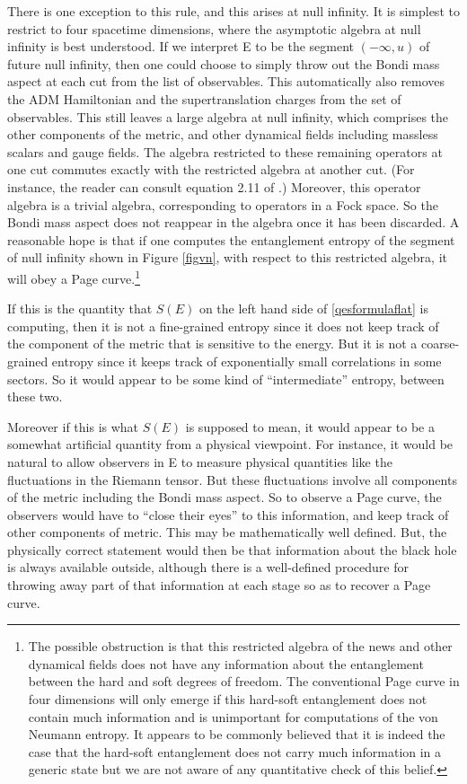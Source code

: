 \documentclass[12pt]{article}
\begin{document}
 
There is one exception to this rule, and this arises at null infinity. It is simplest to restrict to four spacetime dimensions, where the asymptotic algebra at null infinity is best understood. If we interpret E to be the segment $(-\infty, u)$ of future null infinity, then one could choose to simply throw out the  Bondi mass aspect at each cut from the list of observables. This automatically also removes  the ADM Hamiltonian and the  supertranslation charges from the
set of observables.  This still leaves a large algebra at null infinity, which comprises the other components of the metric, and other dynamical fields including massless scalars and gauge fields. The algebra restricted to these remaining operators at one cut commutes exactly with the restricted algebra  at another cut. (For instance, the reader can consult equation 2.11 of \cite{Laddha:2020kvp}.) Moreover, this operator algebra is a trivial algebra, corresponding to operators in a Fock space. So the Bondi mass aspect does not reappear in the algebra once it has been discarded.   A reasonable hope is that if one computes the entanglement entropy of the segment of null infinity shown in Figure \ref{figvn}, with respect to this restricted algebra, it will obey a Page curve.\footnote{The possible obstruction is that 
this restricted algebra of the news and other dynamical fields does not have any information about the entanglement between the hard and soft degrees of freedom. The conventional Page curve in four dimensions will only emerge  if this hard-soft entanglement does not contain much information and is unimportant for computations of the von Neumann entropy. It appears to be commonly believed that it is indeed the case that the hard-soft entanglement does not carry much
information in a generic state but we are not aware of any quantitative check of this belief.} 

If this is the quantity that $S(E)$ on the left hand side of \eqref{qesformulaflat} is computing, then it is not a fine-grained entropy since it does not keep track of the component of the metric that is sensitive to the energy. But it is not a coarse-grained entropy since it keeps track of exponentially small correlations in some sectors. So it would appear to be some kind of ``intermediate'' entropy, between these two.

Moreover if this is what $S(E)$ is supposed to mean, it would appear to be a somewhat artificial quantity from a physical viewpoint. For instance, it would be natural to allow observers in E to measure physical quantities like the fluctuations in the Riemann tensor. But these fluctuations involve all components of the metric including the Bondi mass aspect.  So to observe a Page curve, the observers would have to ``close their eyes'' to this information, and keep track of other components  of metric. This may be mathematically well defined. But, the physically correct statement would then be that information about the black hole is always available outside, although there is a well-defined procedure for throwing away part of that information at each stage so as to recover a Page curve.
\end{document}
